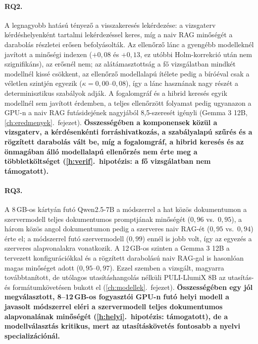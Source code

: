 \paragraph{RQ2.} A legnagyobb hatású tényező a visszakeresés lekérdezése: a vizsgaterv kérdéshelyenként tartalmi
lekérdezéssel keres, míg a naiv RAG minőségét a darabolás részletei erősen befolyásolták. Az ellenőrző lánc a
gyengébb modelleknél javított a minőségi indexen ($+0{,}08$ és $+0{,}13$, ez utóbbi Holm-korrekció után nem
szignifikáns), az erősnél nem; az alátámasztottság a fő vizsgálatban mindkét modellnél kissé csökkent, az
ellenőrző modellalapú ítélete pedig a bíróéval csak a véletlen szintjén egyezik ($\kappa=0{,}00$--$0{,}08$), így
a lánc hasznának nagy részét a determinisztikus szabályok adják. A fogalomgráf és a hibrid keresés egyik
modellnél sem javított érdemben, a teljes ellenőrzött folyamat pedig ugyanazon a GPU-n a naiv RAG futásidejének
nagyjából 8,5-szeresét igényli (Gemma 3 12B, \ref{ch:eredmenyek}.~fejezet). \textbf{Összességében a komponensek
közül a vizsgaterv, a kérdésenkénti forráshivatkozás, a szabályalapú szűrés és a rögzített darabolás vált be, míg
a fogalomgráf, a hibrid keresés és az önmagában álló modellalapú ellenőrzés nem érte meg a többletköltséget
(\ref{h:verif}.~hipotézis: a fő vizsgálatban nem támogatott).}

\paragraph{RQ3.} A 8\,GB-os kártyán futó Qwen2.5-7B a módszerrel a hat közös dokumentumon a szervermodell teljes
dokumentumos promptjának minőségét ($0{,}96$ vs.\ $0{,}95$), a három közös angol dokumentumon pedig a szerveres
naiv RAG-ét ($0{,}95$ vs.\ $0{,}94$) érte el; a módszerrel futó szervermodell ($0{,}99$) ennél is jobb volt, így
az egyezés a szerveres alapvonalakra vonatkozik. A 12\,GB-os szinten a Gemma 3 12B a tervezett konfigurációkkal
és a rögzített darabolású naiv RAG-gal is hasonlóan magas minőséget adott ($0{,}95$--$0{,}97$). Ezzel szemben a
vizsgált, magyarra továbbtanított, de utólagos utasításhangolás nélküli PULI-LlumiX 8B az utasítás- és
formátumkövetésen bukott el (\ref{ch:modellek}.~fejezet). \textbf{Összességében egy jól megválasztott,
8--12\,GB-os fogyasztói GPU-n futó helyi modell a javasolt módszerrel eléri a szervermodell teljes dokumentumos
alapvonalának minőségét (\ref{h:helyi}.~hipotézis: támogatott), de a modellválasztás kritikus, mert az
utasításkövetés fontosabb a nyelvi specializációnál.}

